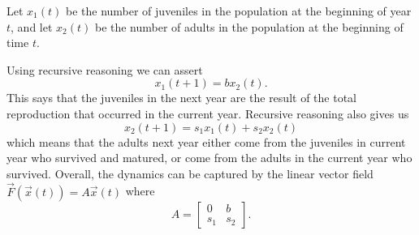 \documentclass[../book.tex]{subfiles}
\begin{document}
\begin{solution}
Let \(x_1(t)\) be the number of juveniles in the population at the beginning of year \(t\), and let \(x_2(t)\) be the number of adults in the population at the beginning of time \(t\).

Using recursive reasoning we can assert
\begin{equation}\label{eq:vec-32}
x_1(t+1) = b x_2(t).
\end{equation}
This says that the juveniles in the next year are the result of the total reproduction that occurred in the current year. Recursive reasoning also gives us
\begin{equation}\label{eq:vec-33}
x_2(t+1) = s_1  x_1(t) + s_2  x_2(t)
\end{equation}
which means that the adults next year either come from the juveniles in current year who survived and matured, or come from the adults in the current year who survived.
Overall, the dynamics can be captured by the linear vector field \(\vec{F}(\vec{x}(t)) = A \vec{x}(t)\) where
\begin{equation}\label{eq:vec-34}
A =
\begin{bmatrix}
  0 & b \\ s_1 & s_2
\end{bmatrix}.
\end{equation}


\end{solution}
\end{document}
